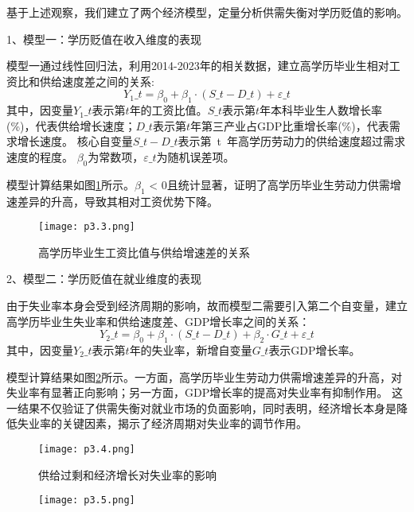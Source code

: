 \documentclass[withoutpreface,bwprint]{cumcmthesis} %
\begin{document}
基于上述观察，我们建立了两个经济模型，定量分析供需失衡对学历贬值的影响。

1、模型一：学历贬值在收入维度的表现

模型一通过线性回归法，利用2014-2023年的相关数据，建立高学历毕业生相对工资比和供给速度差之间的关系:
\begin{equation}
    Y_1 \_{t}=\beta_0+\beta_1 \cdot (S\_{t}-D \_{t})+\varepsilon \_{t}
\end{equation}
其中，因变量$Y_1 \_{t}$表示第$t$年的工资比值。$S \_{t}$表示第$t$年本科毕业生人数增长率(\%)，代表供给增长速度；$D \_{t}$表示第$t$年第三产业占GDP比重增长率(\%)，代表需求增长速度。
核心自变量$S \_{t}-D \_{t}$表示第 t 年高学历劳动力的供给速度超过需求速度的程度。
$\beta_0$为常数项，$\varepsilon \_{t}$为随机误差项。

模型计算结果如图\ref{question3.2}所示。$\beta_1$ < 0且统计显著，证明了高学历毕业生劳动力供需增速差异的升高，导致其相对工资优势下降。
\begin{figure}[H]
    \centering
    \caption{高学历毕业生工资比值与供给增速差的关系}
    \texttt{[image: p3.3.png]} %
	\label{question3.2} %
\end{figure}

2、模型二：学历贬值在就业维度的表现

由于失业率本身会受到经济周期的影响，故而模型二需要引入第二个自变量，建立高学历毕业生失业率和供给速度差、GDP增长率之间的关系：
\begin{equation}
    Y_2 \_{t}=\beta_0+\beta_1 \cdot (S\_{t}-D \_{t})+\beta_2 \cdot G \_{t}+\varepsilon \_{t}
\end{equation}
其中，因变量$Y_2 \_{t}$表示第$t$年的失业率，新增自变量$G \_{t}$表示GDP增长率。

模型计算结果如图\ref{question3.3}所示。一方面，高学历毕业生劳动力供需增速差异的升高，对失业率有显著正向影响；另一方面，GDP增长率的提高对失业率有抑制作用。
这一结果不仅验证了供需失衡对就业市场的负面影响，同时表明，经济增长本身是降低失业率的关键因素，揭示了经济周期对失业率的调节作用。
\begin{figure}[H]
    \centering
    \caption{供给过剩和经济增长对失业率的影响}
    \texttt{[image: p3.4.png]} %
	\label{question3.3} %
\end{figure}

\begin{figure}[H]
    \centering
    \texttt{[image: p3.5.png]} %
\end{figure}
\end{document}
